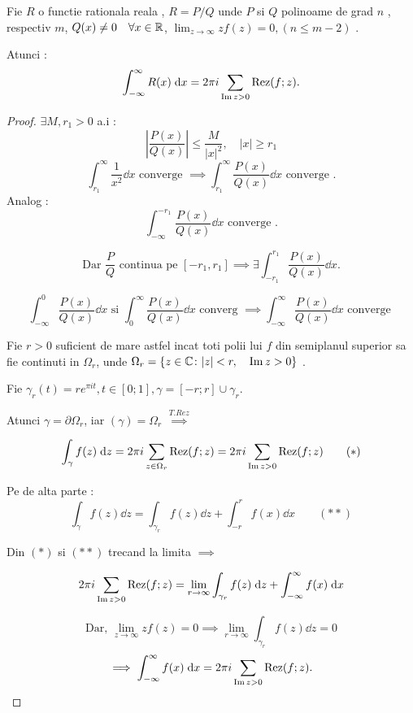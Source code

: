 \begin{tip}
    Fie $R$ o functie rationala reala , $R=P / Q$ unde $P$ si $Q$ polinoame de
    grad $n$ , respectiv $m$, $Q(x)\neq 0 \quad \forall x\in \mathbb{R}$,
    $\displaystyle \lim_{z\to\infty} z f(z) =0, (n \leq m-2)$ .

        Atunci :
    \[
        \int_{-\infty}^{\infty} R(x) \; \mathrm{d} x = 2\pi i \sum_{\operatorname{Im} z > 0} \operatorname{Rez}(f;z) .
    \]
    \begin{proof}
        $\exists M,r_1 >0 $ a.i :
        \[
            \left|\frac{P(x)}{Q(x)} \right| \leq \frac{M}{|x|^2} , \quad |x| \geq r_1
        \]
        \[
            \int_{r_1}^{\infty} \frac{1}{x^2} \dd x \text{ converge } \implies
            \int_{r_1}^{\infty} \frac{P(x)}{Q(x)} \dd x \text{ converge .}
        \]
        Analog :
        \[
           \int_{ - \infty}^{- r_1} \frac{P(x)}{Q(x)} \dd x \text{ converge .}
        \]

        \[
            \text{Dar } \frac{P}{Q} \text{ continua pe } [- r_1, r_1] \implies
            \exists \int_{- r_1}^{r_1} \frac{P(x)}{Q(x)} \dd x .
        \]

        \[
            \int_{- \infty}^{0} \frac{P(x)}{Q(x)} \dd x \text{ si }
            \int_{0}^{\infty} \frac{P(x)}{Q(x)} \dd x \text{ converg } \implies
            \int_{- \infty}^{\infty} \frac{P(x)}{Q(x)} \dd x \text{ converge }
        \]

        Fie $r>0$ suficient de mare astfel incat toti polii lui $f$ din semiplanul
        superior sa fie continuti in $\Omega_r$, unde $\Omega_r = \{z\in\mathbb{C} \colon |z| < r,\quad \operatorname{Im} z > 0\}$ .

        Fie $\gamma_r(t) = r e^{\pi i t}, t\in[0;1], \gamma=[-r;r]\cup \gamma_r$.

        Atunci $\gamma = \partial \Omega_r$, iar $(\gamma) = \Omega_r$
        $\overset{T. Rez}{\implies}$

        \begin{equation*}
            \int_{\gamma} f(z) \; \mathrm{d} z = 2 \pi i \sum_{z \in \Omega_r} \operatorname{Rez}(f;z)
                = 2 \pi i \sum_{\operatorname{Im} z >0} \operatorname{Rez}(f;z)  \qquad (*)
        \end{equation*}

        Pe de alta parte :
        \begin{equation*}
            \int_{\gamma} f(z) \dd z = \int_{\gamma_r} f(z) \dd z + \int_{-r}^{r} f(x) \dd x \qquad (**)
        \end{equation*}

        Din $(*)$ si $(**)$ trecand la limita $\implies$

        \[
            2 \pi i \sum_{\operatorname{Im} z >0} \operatorname{Rez}(f;z) = \lim_{r\to \infty} \int_{\gamma_r} f(z) \; \mathrm{d} z
                + \int_{- \infty}^{\infty} f(x) \; \mathrm{d} x
        \]

        \[
            \text{Dar, } \lim_{z\to\infty} z f(z)=0 \implies \lim_{r\to\infty} \int_{\gamma_r} f(z) \dd z = 0
        \]
        \[
            \implies \int_{- \infty}^{\infty} f(x) \; \mathrm{d} x = 2 \pi i \sum_{\operatorname{Im} z >0} \operatorname{Rez}(f;z) .
        \]
    \end{proof}
\end{tip}


